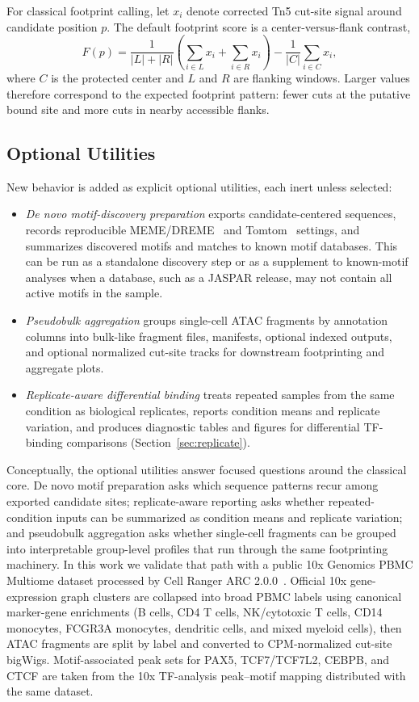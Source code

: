 \documentclass[biomedinformatics,article,submit,pdftex,moreauthors]{Definitions/mdpi}
\begin{document}
For classical footprint calling, let $x_i$ denote corrected Tn5 cut-site signal
around candidate position $p$. The default footprint score is a center-versus-flank
contrast,
\[
F(p)=\frac{1}{|L|+|R|}\left(\sum_{i\in L}x_i+\sum_{i\in R}x_i\right)-
\frac{1}{|C|}\sum_{i\in C}x_i,
\]
where $C$ is the protected center and $L$ and $R$ are flanking windows. Larger
values therefore correspond to the expected footprint pattern: fewer cuts at the
putative bound site and more cuts in nearby accessible flanks.

\subsection{Optional Utilities}

New behavior is added as explicit optional utilities, each inert unless selected:
\begin{itemize}
  \item \emph{De novo motif-discovery preparation} exports candidate-centered
        sequences, records reproducible MEME/DREME~\cite{bailey2015meme} and
        Tomtom~\cite{gupta2007tomtom} settings, and summarizes discovered motifs
        and matches to known motif databases. This can be run as a standalone
        discovery step or as a supplement to known-motif analyses when a database,
        such as a JASPAR release, may not contain all active motifs in the sample.
  \item \emph{Pseudobulk aggregation} groups single-cell ATAC fragments by
        annotation columns into bulk-like fragment files, manifests, optional
        indexed outputs, and optional normalized cut-site tracks for downstream
        footprinting and aggregate plots.
  \item \emph{Replicate-aware differential binding} treats repeated samples from
        the same condition as biological replicates, reports condition means and
        replicate variation, and produces diagnostic tables and figures for
        differential TF-binding comparisons (Section~\ref{sec:replicate}).
\end{itemize}

Conceptually, the optional utilities answer focused questions around the
classical core. De novo motif preparation asks which sequence patterns recur among
exported candidate sites; replicate-aware reporting asks whether repeated-condition
inputs can be summarized
as condition means and replicate variation; and pseudobulk aggregation asks
whether single-cell fragments can be grouped into interpretable group-level
profiles that run through the same footprinting machinery. In this work we validate that path
with a public 10x Genomics PBMC Multiome dataset processed by Cell Ranger ARC
2.0.0~\cite{tenxpbmc2021}. Official 10x gene-expression graph clusters are
collapsed into broad PBMC labels using canonical marker-gene enrichments (B cells,
CD4 T cells, NK/cytotoxic T cells, CD14 monocytes, FCGR3A monocytes, dendritic
cells, and mixed myeloid cells), then ATAC fragments are split by label and
converted to CPM-normalized cut-site bigWigs. Motif-associated peak sets for PAX5,
TCF7/TCF7L2, CEBPB, and CTCF are taken from the 10x TF-analysis peak--motif
mapping distributed with the same dataset.
\end{document}
